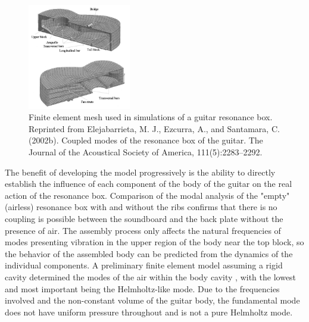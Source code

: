 \documentclass[
reprint,amsmath,amssymb,showpacs,citeautoscript,prb,twocolumn,notitlepage,floatfix
]{revtex4-1}
\begin{document}
\begin{figure}[ht]
    \begin{center}
        \includegraphics[width=0.4\textwidth]{images/elejabarrieta-fe-model.png}
        \caption{Finite element mesh used in simulations of a guitar resonance box. Reprinted from Elejabarrieta, M. J., Ezcurra, A., and Santamara, C. (2002b). Coupled modes of the resonance box of the guitar. The Journal of the Acoustical Society of America, 111(5):2283–2292.}
        \label{fig:finiteelement}
    \end{center}
\end{figure}

The benefit of developing the model progressively is the ability to directly establish the influence of each component of the body of the guitar on the real action of the resonance box. Comparison of the modal analysis of the "empty" (airless) resonance box with and without the ribs confirms that there is no coupling is possible between the soundboard and the back plate without the presence of air. The assembly process only affects the natural frequencies of modes presenting vibration in the upper region of the body near the top block, so the behavior of the assembled body can be predicted from the dynamics of the individual components. A preliminary finite element model assuming a rigid cavity determined the modes of the air within the body cavity \cite{elejabarrieta2002:aircavitymodes}, with the lowest and most important being the Helmholtz-like mode. Due to the frequencies involved and the non-constant volume of the guitar body, the fundamental mode does not have uniform pressure throughout and is not a pure Helmholtz mode.
\end{document}

